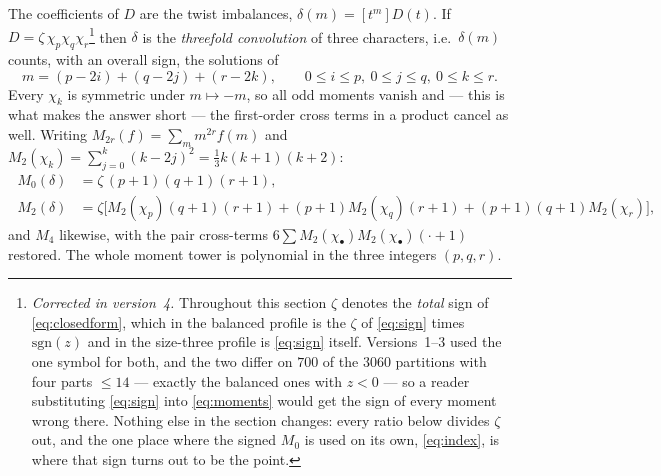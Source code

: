 \documentclass[11pt,a4paper]{article}
\begin{document}
The coefficients of $D$ are the twist imbalances, $\delta(m)=[t^m]D(t)$. If
$D=\zeta\,\chi_p\chi_q\chi_r$\footnote{\emph{Corrected in version~4.} Throughout this section $\zeta$ denotes the \emph{total}
sign of \eqref{eq:closedform}, which in the balanced profile is the $\zeta$ of \eqref{eq:sign}
times $\mathrm{sgn}(z)$ and in the size-three profile is \eqref{eq:sign} itself. Versions~1--3
used the one symbol for both, and the two differ on $700$ of the $3060$ partitions with four
parts $\le14$ --- exactly the balanced ones with $z<0$ --- so a reader substituting
\eqref{eq:sign} into \eqref{eq:moments} would get the sign of every moment wrong there. Nothing
else in the section changes: every ratio below divides $\zeta$ out, and the one place where the
signed $M_0$ is used on its own, \eqref{eq:index}, is where that sign turns out to be the point.}
then $\delta$ is the \emph{threefold convolution} of three
characters, i.e.\ $\delta(m)$ counts, with an overall sign, the solutions of
\begin{equation}\label{eq:convolution}
m=(p-2i)+(q-2j)+(r-2k),\qquad 0\le i\le p,\ 0\le j\le q,\ 0\le k\le r .
\end{equation}
Every $\chi_k$ is symmetric under $m\mapsto-m$, so all odd moments vanish and --- this is what
makes the answer short --- the first-order cross terms in a product cancel as well. Writing
$M_{2r}(f)=\sum_m m^{2r}f(m)$ and $M_2(\chi_k)=\sum_{j=0}^{k}(k-2j)^2=\tfrac13k(k+1)(k+2)$:
\begin{equation}\label{eq:moments}
\boxed{\;
\begin{aligned}
M_0(\delta)&=\zeta\,(p{+}1)(q{+}1)(r{+}1),\\[2pt]
M_2(\delta)&=\zeta\Big[M_2(\chi_p)(q{+}1)(r{+}1)+(p{+}1)M_2(\chi_q)(r{+}1)
+(p{+}1)(q{+}1)M_2(\chi_r)\Big],
\end{aligned}\;}
\end{equation}
and $M_4$ likewise, with the pair cross-terms $6\sum M_2(\chi_\bullet)M_2(\chi_\bullet)(\cdot+1)$
restored. The whole moment tower is polynomial in the three integers $(p,q,r)$.
\end{document}

